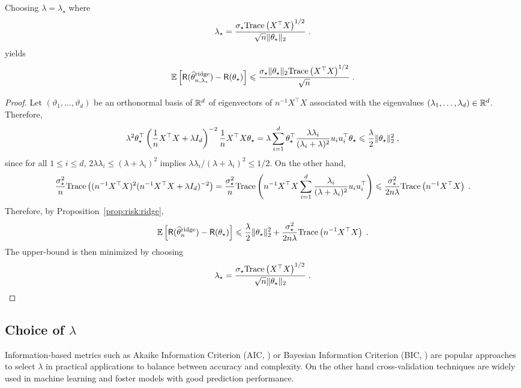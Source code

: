 \begin{proposition}
Choosing $\lambda = \lambda_\star$ where 
$$
\lambda_\star = \frac{\sigma_\star \mathrm{Trace}\left(X^\top X\right)^{1/2}}{\sqrt{n}\|\theta_\star\|_2} \;.
$$
yields
$$
\mathbb{E}\left[\mathsf{R}(\widehat {\theta}^{\mathrm{ridge}}_{n,\lambda_\star}) - \mathsf{R}(\theta_\star)\right]  \leqslant \frac{\sigma_\star \|\theta_\star\|_2 \mathrm{Trace}\left(X^\top X\right)^{1/2}}{\sqrt{n}}  \;.
$$
\end{proposition}
\begin{proof}
Let $(\vartheta_1,\ldots,\vartheta_d)$ be an orthonormal basis of $\mathbb{R}^d$ of eigenvectors of $n^{-1}X^\top X$ associated with the eigenvalues $(\lambda_1,\ldots,\lambda_d)\in\mathbb{R}^d$. Therefore,
$$
 \lambda^2\theta_\star^\top\left(\frac{1}{n}X^\top X + \lambda I_d\right)^{-2} \frac{1}{n}X^\top X \theta_\star = \lambda\sum_{i=1}^d \theta_\star^\top \frac{\lambda \lambda_i}{(\lambda_i + \lambda)^2} u_iu_i^\top \theta_\star \leqslant  \frac{\lambda}{2}\|\theta_\star\|_2^2\;,
$$
since for all $1\leqslant i \leqslant d$, $2\lambda \lambda_i \leqslant (\lambda + \lambda_i)^2$ implies $\lambda \lambda_i/(\lambda + \lambda_i)^2 \leqslant 1/2$. On the other hand,
$$
\frac{\sigma_\star^{2}}{n}\mathrm{Trace}\left((n^{-1}X^\top X)^2(n^{-1}X^\top X + \lambda I_d)^{-2}\right) = \frac{\sigma_\star^{2}}{n}\mathrm{Trace}\left(n^{-1}X^\top X\sum_{i=1}^d\frac{\lambda_i}{(\lambda + \lambda_i)^2}u_iu_i^\top\right) \leqslant \frac{\sigma_\star^{2}}{2n\lambda }\mathrm{Trace}\left(n^{-1}X^\top X\right) \;.
$$
Therefore, by Proposition~\ref{prop:risk:ridge},
$$
\mathbb{E}\left[\mathsf{R}(\widehat {\theta}^{\mathrm{ridge}}_n) - \mathsf{R}(\theta_\star)\right]  \leqslant \frac{\lambda}{2}\|\theta_\star\|_2^2 + \frac{\sigma_\star^{2}}{2n\lambda}\mathrm{Trace}\left(n^{-1}X^\top X\right)\;.
$$
The upper-bound is then minimized by choosing 
$$
\lambda_\star = \frac{\sigma_\star \mathrm{Trace}\left(X^\top X\right)^{1/2}}{\sqrt{n}\|\theta_\star\|_2} \;.
$$
\end{proof}

\subsection{Choice of $\lambda$}
\label{sec:ridge:choicepen}
Information-based metrics such as Akaike Information Criterion (AIC, \cite{akaike1974new}) or Bayesian Information Criterion (BIC, \cite{schwarz1978estimating}) are popular approaches to select $\lambda$ in practical applications to balance between accuracy and complexity. On the other hand cross-validation techniques are widely used in machine learning and foster models with good prediction performance.

